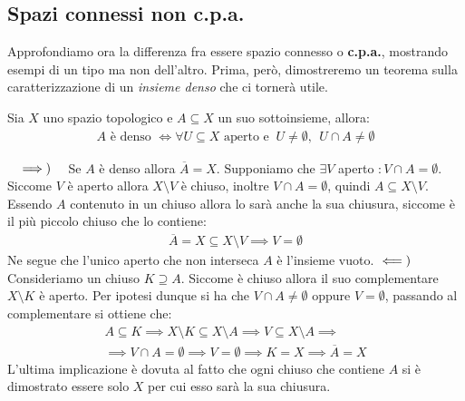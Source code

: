 \subsection{Spazi connessi non c.p.a.}
Approfondiamo ora la differenza fra essere spazio connesso o \textbf{c.p.a.}, mostrando esempi di un tipo ma non dell'altro. Prima, però, dimostreremo un teorema sulla caratterizzazione di un \textit{insieme denso} che ci tornerà utile.
\begin{theorema}
	Sia $X$ uno spazio topologico e $A\subseteq X$ un suo sottoinsieme, allora:
		\begin{gather*}
			A \text{ è denso }\iff \forall U\subseteq X \text{ aperto e } \ U\neq\emptyset, \ \ U\cap A\neq\emptyset	
		\end{gather*}
	\vspace{-6mm}
\end{theorema}
\begin{demonstration}~{}
	$\implies)\quad$ Se $A$ è denso allora $\overline{A}=X$. Supponiamo che $\exists V$ aperto $\colon V\cap A=\emptyset$. Siccome $V$ è aperto allora $X\setminus V$ è chiuso, inoltre $V\cap A=\emptyset$, quindi $A\subseteq X\setminus V$. Essendo $A$ contenuto in un chiuso allora lo sarà anche la sua chiusura, siccome è il più piccolo chiuso che lo contiene:
		\begin{gather*}
			\overline{A}=X\subseteq X\setminus V \implies V=\emptyset
		\end{gather*}
	Ne segue che l'unico aperto che non interseca $A$ è l'insieme vuoto. \newline
	$\impliedby)\quad$ Consideriamo un chiuso $K\supseteq A$. Siccome è chiuso allora il suo complementare $X\setminus K$ è aperto. Per ipotesi dunque si ha che $V\cap A\neq \emptyset$ oppure $V=\emptyset$, passando al complementare si ottiene che:
		\begin{equation*}
			\begin{array}{l}
				A\subseteq K \implies X\setminus K \subseteq X\setminus A \implies V\subseteq X\setminus A \implies \\
				\implies V\cap A=\emptyset \implies V=\emptyset \implies K=X \implies \overline{A}=X
			\end{array}
		\end{equation*}
	L'ultima implicazione è dovuta al fatto che ogni chiuso che contiene $A$ si è dimostrato essere solo $X$ per cui esso sarà la sua chiusura.
\end{demonstration}

